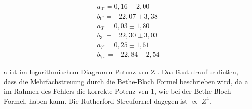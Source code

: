 \begin{align*}
a_{0^\circ}= 0,16 \pm 2,00
\\
b_{0^\circ}= -22,07 \pm 3,38
\\
a_{3^\circ}= 0,03 \pm 1,80
\\
b_{3^\circ}= -22,30 \pm 3,03
\\
a_{7^\circ}= 0,25 \pm 1,51
\\
b_{7\circ}= -22,84 \pm 2,54
\end{align*}

a ist im logarithmischem Diagramm Potenz von Z . Das lässt drauf schließen, dass die Mehrfachstreuung durch die Bethe-Bloch Formel beschrieben wird, da a im Rahmen des Fehlers die korrekte Potenz von 1, wie bei der Bethe-Bloch Formel, haben kann. Die Rutherford Streuformel dagegen ist $\propto$ $Z^4$.
